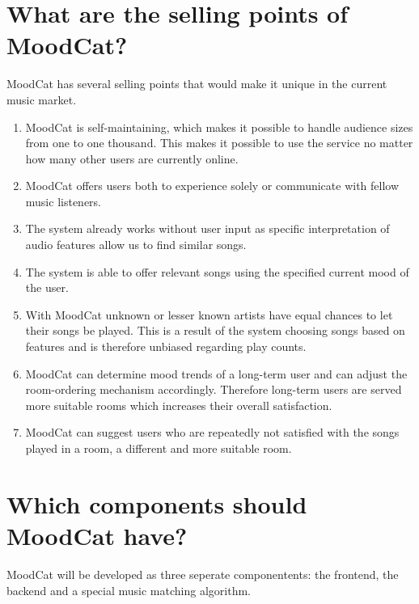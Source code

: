 \documentclass[10pt,a4paper]{article}
\begin{document}
\section{What are the selling points of MoodCat?}
MoodCat has several selling points that would make it unique in the current music market.

\begin{enumerate}
\item MoodCat is self-maintaining, which makes it possible to handle audience sizes from one to one thousand.
This makes it possible to use the service no matter how many other users are currently online.

\item MoodCat offers users both to experience solely or communicate with fellow music listeners.

\item The system already works without user input as specific interpretation of audio features allow us to find similar songs.

\item The system is able to offer relevant songs using the specified current mood of the user.

\item With MoodCat unknown or lesser known artists have equal chances to let their songs be played.
This is a result of the system choosing songs based on features and is therefore unbiased regarding play counts.

\item MoodCat can determine mood trends of a long-term user and can adjust the room-ordering mechanism accordingly.
Therefore long-term users are served more suitable rooms which increases their overall satisfaction.

\item MoodCat can suggest users who are repeatedly not satisfied with the songs played in a room, a different and more suitable room.
\end{enumerate}

\section{Which components should MoodCat have?}
MoodCat will be developed as three seperate componentents: the frontend, the backend and a special music matching algorithm.
\end{document}
